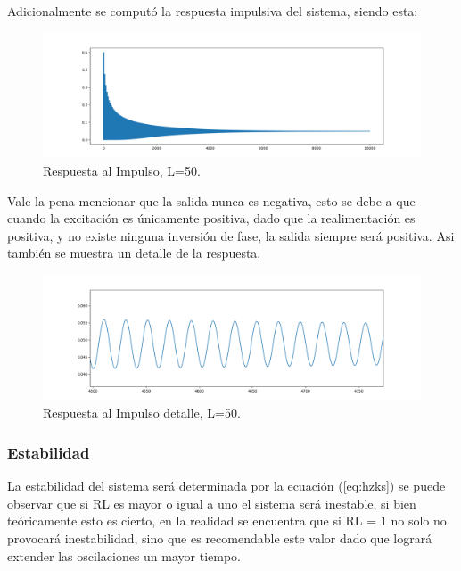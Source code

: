 Adicionalmente se computó la respuesta impulsiva del sistema, siendo esta:
\begin{figure}[H]
	\centering
	\includegraphics[width=\textwidth]{ImagenesEjercicio4/impulseResponse.PNG}
\caption{Respuesta al Impulso, L=50.}
	\label{fig:impulse}
\end{figure}
Vale la pena mencionar que la salida nunca es negativa, esto se debe a que cuando la excitación es únicamente positiva, dado que la realimentación es positiva, y no existe ninguna inversión de fase, la salida siempre será positiva.
Asi también se muestra un detalle de la respuesta.
\begin{figure}[H]
	\centering
	\includegraphics[width=\textwidth]{ImagenesEjercicio4/impulseResponseDETAIL.PNG}
\caption{Respuesta al Impulso detalle, L=50.}
	\label{fig:impulsed}
\end{figure}
\subsubsection{Estabilidad}
La estabilidad del sistema será determinada por la ecuación (\ref{eq:hzks}) se puede observar que si RL es mayor o igual a uno el sistema será inestable, si bien teóricamente esto es cierto, en la realidad se encuentra que si RL = 1 no solo no provocará inestabilidad, sino que es recomendable este valor dado que logrará extender las oscilaciones  un mayor tiempo.
